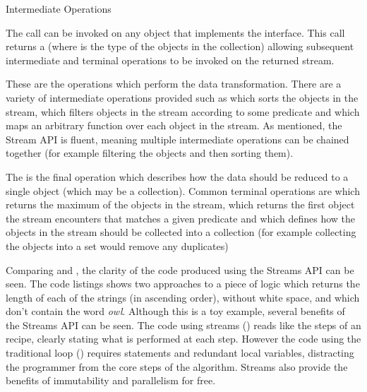 \begin{labeling}{Intermediate Operations  }
	\item [Initial stream call] The  call can be invoked on any object that implements the  interface. This call returns a  (where  is the type of the objects in the collection) allowing subsequent intermediate and terminal operations to be invoked on the returned stream.
	\item [Intermediate Operations  ] These are the operations which perform the data transformation. There are a variety of intermediate operations provided such as  which sorts the objects in the stream,  which filters objects in the stream according to some predicate and  which maps an arbitrary function over each object in the stream. As mentioned, the Stream API is fluent, meaning multiple intermediate operations can be chained together (for example filtering the objects and then sorting them).
	\item [Terminal Operations] The is the final operation which describes how the data should be reduced to a single object (which may be a collection). Common terminal operations are  which returns the maximum of the objects in the stream,  which returns the first object the stream encounters that matches a given predicate and  which defines how the objects in the stream should be collected into a collection (for example collecting the objects into a set would remove any duplicates)
\end{labeling}

Comparing  and , the clarity of the code produced using the Streams API can be seen. The code listings shows two approaches to a piece of logic which returns the length of each of the strings (in ascending order), without white space, and which don't contain the word \textit{owl}. Although this is a toy example, several benefits of the Streams API can be seen. The code using streams () reads like the steps of an recipe, clearly stating what is performed at each step. However the code using the traditional  loop () requires  statements and redundant local variables, distracting the programmer from the core steps of the algorithm. Streams also provide the benefits of immutability and parallelism for free.



